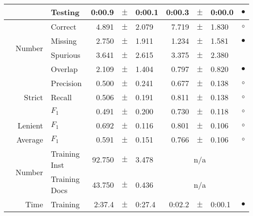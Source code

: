 \begin{longtable}{|r|r|l||rcl|rcl|c|}
\cline{3-10} &                             &         Testing &      0:00.9 &  $\pm$  &      0:00.1 &      0:00.3 &  $\pm$  &      0:00.0 & $\bullet$ \\
\hline
\pagebreak
\hline
\hline
\multirow{11}{*}{\begin{sideways}professional unit\end{sideways} }
             & \multirow{4}{*}{    Number} &         Correct &       4.891 &  $\pm$  &       2.079 &       7.719 &  $\pm$  &       1.830 & $\circ$ \\
\cline{3-10} &                             &         Missing &       2.750 &  $\pm$  &       1.911 &       1.234 &  $\pm$  &       1.581 & $\bullet$ \\
\cline{3-10} &                             &        Spurious &       3.641 &  $\pm$  &       2.615 &       3.375 &  $\pm$  &       2.380 &  \\
\cline{3-10} &                             &         Overlap &       2.109 &  $\pm$  &       1.404 &       0.797 &  $\pm$  &       0.820 & $\bullet$ \\
\cline{2-10} & \multirow{3}{*}{    Strict} &       Precision &       0.500 &  $\pm$  &       0.241 &       0.677 &  $\pm$  &       0.138 & $\circ$ \\
\cline{3-10} &                             &          Recall &       0.506 &  $\pm$  &       0.191 &       0.811 &  $\pm$  &       0.138 & $\circ$ \\
\cline{3-10} &                             &           $F_1$ &       0.491 &  $\pm$  &       0.200 &       0.730 &  $\pm$  &       0.118 & $\circ$ \\
\cline{2-10} &                     Lenient &           $F_1$ &       0.692 &  $\pm$  &       0.116 &       0.801 &  $\pm$  &       0.106 & $\circ$ \\
\cline{2-10} &                     Average &           $F_1$ &       0.591 &  $\pm$  &       0.151 &       0.766 &  $\pm$  &       0.106 & $\circ$ \\
\cline{2-10} & \multirow{2}{*}{    Number} &   Training Inst &      92.750 &  $\pm$  &       3.478 &    \multicolumn{3}{c|}{n/a}         &  \\
\cline{3-10} &                             &   Training Docs &      43.750 &  $\pm$  &       0.436 &    \multicolumn{3}{c|}{n/a}         &  \\
\cline{2-10} & \multirow{2}{*}{      Time} &        Training &      2:37.4 &  $\pm$  &      0:27.4 &      0:02.2 &  $\pm$  &      0:00.1 & $\bullet$ \\

\end{longtable}
